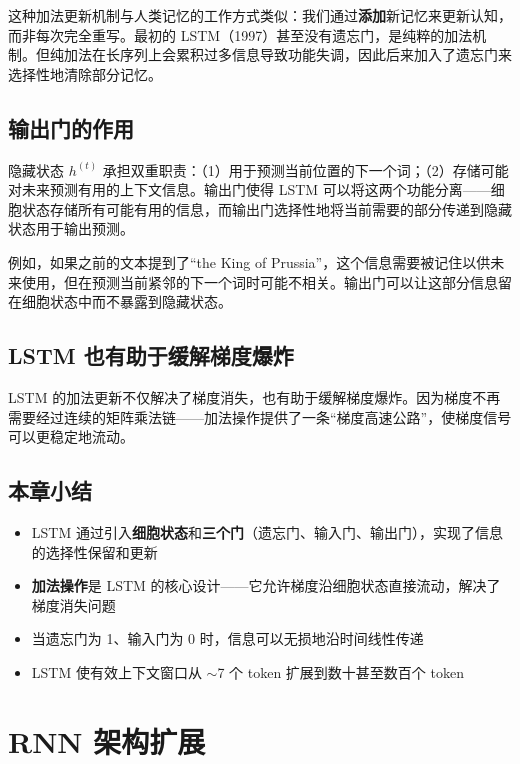 \documentclass[a4paper]{article}
\begin{document}
这种加法更新机制与人类记忆的工作方式类似：我们通过\textbf{添加}新记忆来更新认知，而非每次完全重写。最初的 LSTM（1997）甚至没有遗忘门，是纯粹的加法机制。但纯加法在长序列上会累积过多信息导致功能失调，因此后来加入了遗忘门来选择性地清除部分记忆。

\subsection{输出门的作用}

隐藏状态 $h^{(t)}$ 承担双重职责：（1）用于预测当前位置的下一个词；（2）存储可能对未来预测有用的上下文信息。输出门使得 LSTM 可以将这两个功能分离——细胞状态存储所有可能有用的信息，而输出门选择性地将当前需要的部分传递到隐藏状态用于输出预测。

例如，如果之前的文本提到了``the King of Prussia''，这个信息需要被记住以供未来使用，但在预测当前紧邻的下一个词时可能不相关。输出门可以让这部分信息留在细胞状态中而不暴露到隐藏状态。

\subsection{LSTM 也有助于缓解梯度爆炸}

LSTM 的加法更新不仅解决了梯度消失，也有助于缓解梯度爆炸。因为梯度不再需要经过连续的矩阵乘法链——加法操作提供了一条``梯度高速公路''，使梯度信号可以更稳定地流动。

\subsection{本章小结}

\begin{itemize}
    \item LSTM 通过引入\textbf{细胞状态}和\textbf{三个门}（遗忘门、输入门、输出门），实现了信息的选择性保留和更新
    \item \textbf{加法操作}是 LSTM 的核心设计——它允许梯度沿细胞状态直接流动，解决了梯度消失问题
    \item 当遗忘门为 1、输入门为 0 时，信息可以无损地沿时间线性传递
    \item LSTM 使有效上下文窗口从 $\sim$7 个 token 扩展到数十甚至数百个 token
\end{itemize}


\section{RNN 架构扩展}
\end{document}
